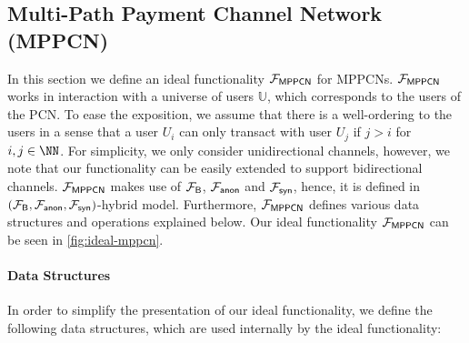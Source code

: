 \subsection{Multi-Path Payment Channel Network (MPPCN)}
\label{sec:mppcn}

In this section we define an ideal functionality $\mathcal{F}_{\mathsf{MPPCN}}$ for MPPCNs. 
$\mathcal{F}_{\mathsf{MPPCN}}$ works in interaction with a universe of users $\mathbb{U}$, which 
corresponds to the users of the PCN. To ease the exposition, we assume that there is a 
well-ordering to the users in a sense that a user $U_i$ can only transact with user $U_j$ 
if $j > i$ for $i,j \in \NN$. For simplicity, we only consider unidirectional channels, 
however, we note that our functionality can be easily extended to support bidirectional 
channels. $\mathcal{F}_{\mathsf{MPPCN}}$ makes use of $\mathcal{F}_{\mathsf{B}}$, $\mathcal{F}_{\mathsf{anon}}$ and $\mathcal{F}_{\mathsf{syn}}$, 
hence, it is defined in $(\mathcal{F}_{\mathsf{B}}, \mathcal{F}_{\mathsf{anon}}, \mathcal{F}_{\mathsf{syn}})$-hybrid model. Furthermore, 
$\mathcal{F}_{\mathsf{MPPCN}}$ defines various data structures and operations explained below. 
Our ideal functionality $\mathcal{F}_{\mathsf{MPPCN}}$ can be seen in \cref{fig:ideal-mppcn}.

\paragraph{Data Structures} 
In order to simplify the presentation of our ideal functionality, we define the following 
data structures, which are used internally by the ideal functionality:

